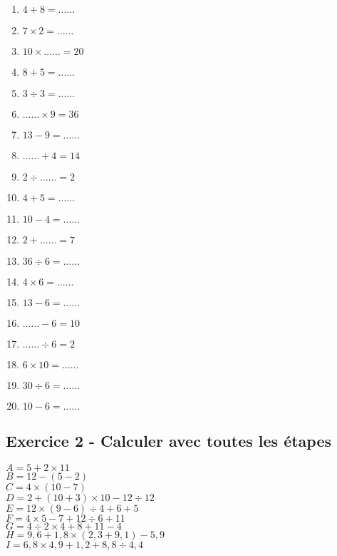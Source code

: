 \documentclass[11pt]{article}
\begin{document}
\begin{multicols}{4}\noindent
  \begin{enumerate}
    \item $4 + 8 = \ldots\ldots$
    \item $7 \times 2 = \ldots\ldots$
    \item $10 \times \ldots\ldots = 20$
    \item $8 + 5 = \ldots\ldots$
    \item $3 \div 3 = \ldots\ldots$
    \item $\ldots\ldots \times 9 = 36$
    \item $13 - 9 = \ldots\ldots$
    \item $\ldots\ldots + 4 = 14$
    \item $2 \div \ldots\ldots = 2$
    \item $4 + 5 = \ldots\ldots$
    \item $10 - 4 = \ldots\ldots$
    \item $2 + \ldots\ldots = 7$
    \item $36 \div 6 = \ldots\ldots$
    \item $4 \times 6 = \ldots\ldots$
    \item $13 - 6 = \ldots\ldots$
    \item $\ldots\ldots - 6 = 10$
    \item $\ldots\ldots \div 6 = 2$
    \item $6 \times 10 = \ldots\ldots$
    \item $30 \div 6 = \ldots\ldots$ 
    \item $10 - 6 = \ldots\ldots$
  \end{enumerate}
 \end{multicols}

\subsection*{Exercice 2 - Calculer avec toutes les étapes}

\begin{multicols}{3}
  \noindent
  $A = 5+2\times 11 $\\
  $B = 12-(5-2) $\\
  $C = 4 \times (10-7) $\\
  $D = 2+(10+3)\times 10-12\div 12 $\\
  $E = 12 \times (9-6) \div 4+6+5 $\\
  $F = 4\times 5-7+12\div 6+11 $\\
  $G = 4\div 2\times 4+8+11-4 $\\
  $H = 9{,}6+1{,}8\times (2{,}3+9{,}1)-5{,}9 $\\
  $I= 6{,}8\times 4{,}9+1{,}2+8{,}8\div 4{,}4$
\end{multicols}
\end{document}
